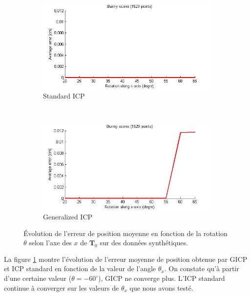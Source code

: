 \begin{figure}[!h]
   \centering
   \begin{subfigure}[t]{.5\linewidth}
     \centering
     \includegraphics[scale=0.4]{Images/Resultats/bunny_offset_evol-error_sicp.jpg}
     \caption{Standard ICP}
   \end{subfigure}%
   ~
   \begin{subfigure}[t]{.5\linewidth}
     \centering
     \includegraphics[scale=0.4]{Images/Resultats/bunny_offset_evol-error_gicp.jpg}
     \caption{Generalized ICP}
   \end{subfigure}
   
   \caption{Évolution de l'erreur de position moyenne en fonction de la rotation $\theta$ selon l'axe des $x$ de $\mathbf{T}_0$ sur des données synthétiques.}
   \label{fig:offset}
\end{figure}


La figure \ref{fig:offset} montre l'évolution de l'erreur moyenne de position obtenue par GICP et ICP standard en fonction de la valeur de l'angle $\theta_{x}$. On constate qu'à partir d'une certaine valeur ($\theta = -60^{\circ}$), GICP ne converge plus. L'ICP standard continue à converger sur les valeurs de $\theta_{x}$ que nous avons testé.\\

